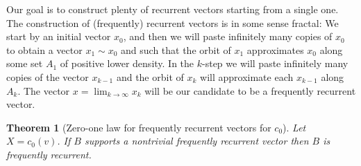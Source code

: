 \documentclass[11pt]{amsart}
\newtheorem{theorem}{Theorem}[section]
\begin{document}
Our goal is to construct plenty of recurrent vectors starting from a single one. The construction of (frequently) recurrent vectors is in some sense fractal: We start by an initial vector $x_0$, and then we will  paste infinitely many copies of $x_0$ to obtain a vector $x_1\sim x_0$ and  such that the orbit of $x_1$ approximates $x_0$ along some set $A_1$ of positive lower density. In the $k$-step we will paste infinitely many copies of the vector $x_{k-1}$ and the orbit of $x_k$ will approximate each $x_{k-1}$ along  $A_k$. The vector $x=\lim_{k\to \infty} x_k$ will be our candidate to be a frequently recurrent vector. 

\begin{theorem}[Zero-one law for frequently recurrent vectors for $c_0$]\label{0-1 law frequent recurrence c0}
Let $X=c_0(v)$. If $B$ supports a nontrivial frequently recurrent vector then $B$ is frequently recurrent.
\end{theorem}
\end{document}
